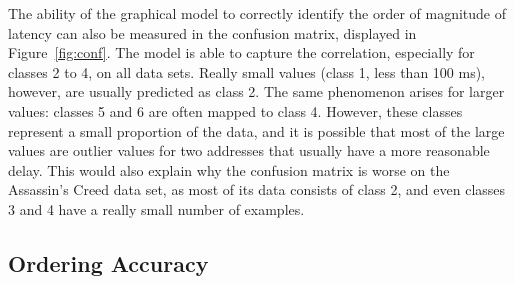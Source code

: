 \documentclass[10pt,a4paper,notitlepage,twocolumn]{article}
\begin{document}
The ability of the graphical model to correctly identify the order of
magnitude of latency can also be measured in the confusion matrix,
displayed in Figure~\ref{fig:conf}.  The model is able to capture the
correlation, especially for classes 2 to 4, on all data sets. Really
small values (class 1, less than 100 ms), however, are usually predicted
as class 2. The same phenomenon arises for larger values: classes 5 and
6 are often mapped to class 4.  However, these classes represent a small
proportion of the data, and it is possible that most of the large values
are outlier values for two addresses that usually have a more reasonable
delay. This would also explain why the confusion matrix is worse on the
Assassin's Creed data set, as most of its data consists of class 2, and
even classes 3 and 4 have a really small number of examples.

\subsection{Ordering Accuracy}
\label{sec:oa}
\end{document}
